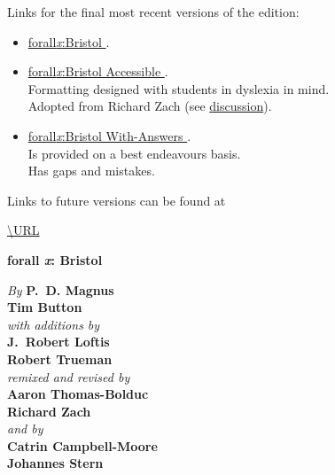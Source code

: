 


\pagestyle{empty}


\newpage
\noindent Links for the \iffinalversion
			final
			\else
			most recent
			\fi
			versions of the \AcademicYearText edition:
\begin{itemize}
	\item \href{\URLforEditionVersions/forallxbris.pdf}{forall\textit{x}:Bristol \AcademicYearText}. 
	\item \href{\URLforEditionVersions/forallxbris-accessible.pdf}{forall\textit{x}:Bristol Accessible \AcademicYearText}. \\Formatting designed with students in dyslexia in mind. \\Adopted from Richard Zach (see \href{https://richardzach.org/2017/11/making-an-accessible-open-logic-textbook-for-dyslexics/}{discussion}).
	\item \href{\URLforEditionVersions/forallxbris-withanswers.pdf}{forall\textit{x}:Bristol With-Answers \AcademicYearText}. \\Is provided on a best endeavours basis. \\Has gaps and mistakes.
\end{itemize}

\bigskip 
\noindent Links to future versions can be found at \begin{center}
	\url{\URL}
\end{center}

\newpage

\vspace*{80pt}



\begin{center}
\fontsize{30pt}{24pt}\sffamily
\selectfont
  \textbf{forall\!
  {\fontsize{37pt}{24pt}\selectfont\rmfamily\textit{x}}: 
  Bristol}
\end{center}


\vfill\noindent
\fontsize{12pt}{16pt}\selectfont \textit{By } \textbf{P.~D. Magnus}\\
\textbf{Tim Button}\\
\textit{with additions by}\\
\textbf{J.~Robert Loftis}\\
\textbf{Robert Trueman}\\
\textit{remixed and revised by}\\
\textbf{Aaron Thomas-Bolduc}\\ \textbf{Richard Zach}\\
\textit{and by}\\
\textbf{Catrin Campbell-Moore}\\ \textbf{Johannes Stern}



